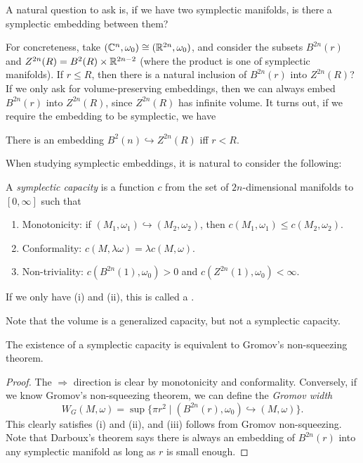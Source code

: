 \documentclass[a4paper]{article}
\begin{document}
A natural question to ask is, if we have two symplectic manifolds, is there a symplectic embedding between them?

For concreteness, take $(\mathbb{C}^n, \omega_0) \cong (\mathbb{R}^{2n}, \omega_0)$, and consider the subsets $B^{2n}(r)$ and $Z^{2n}(R) = B^2(R) \times \mathbb{R}^{2n - 2}$ (where the product is one of symplectic manifolds). If $r \leq R$, then there is a natural inclusion of $B^{2n}(r)$ into $Z^{2n}(R)$? If we only ask for volume-preserving embeddings, then we can always embed $B^{2n}(r)$ into $Z^{2n}(R)$, since $Z^{2n}(R)$ has infinite volume. It turns out, if we require the embedding to be symplectic, we have
\begin{thm}
  There is an embedding $B^{2}(n) \hookrightarrow Z^{2n}(R)$ iff $r < R$.
\end{thm}

When studying symplectic embeddings, it is natural to consider the following:
\begin{defi}
  A \emph{symplectic capacity} is a function $c$ from the set of $2n$-dimensional manifolds to $[0, \infty]$ such that
  \begin{enumerate}
    \item Monotonicity: if $(M_1, \omega_1) \hookrightarrow (M_2, \omega_2)$, then $c(M_1, \omega_1) \leq c(M_2, \omega_2)$.
    \item Conformality: $c(M, \lambda \omega) = \lambda c(M, \omega)$.
    \item Non-triviality: $c(B^{2n}(1), \omega_0) > 0$ and $c(Z^{2n}(1), \omega_0) < \infty$.
  \end{enumerate}
  If we only have (i) and (ii), this is called a .
\end{defi}
Note that the volume is a generalized capacity, but not a symplectic capacity.

\begin{prop}
  The existence of a symplectic capacity is equivalent to Gromov's non-squeezing theorem.
\end{prop}

\begin{proof}
  The $\Rightarrow$ direction is clear by monotonicity and conformality. Conversely, if we know Gromov's non-squeezing theorem, we can define the \emph{Gromov width}
  \[
    W_G(M, \omega) = \sup \{\pi r^2 \mid (B^{2n}(r), \omega_0) \hookrightarrow (M, \omega)\}.
  \]
  This clearly satisfies (i) and (ii), and (iii) follows from Gromov non-squeezing. Note that Darboux's theorem says there is always an embedding of $B^{2n}(r)$ into any symplectic manifold as long as $r$ is small enough.
\end{proof}

\printindex
\end{document}
